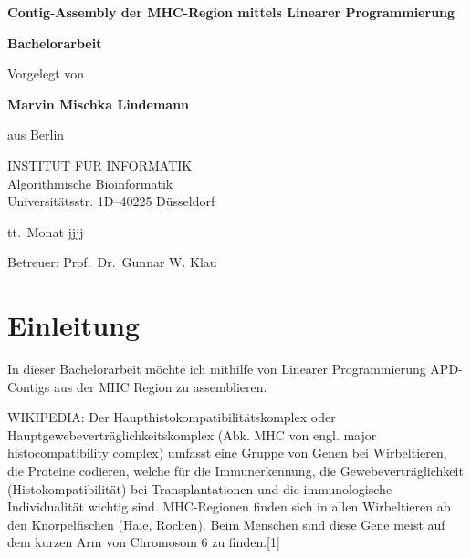 \documentclass[12pt,ngerman,titlepage,a4paper]{article}
\begin{document}
\begin{titlepage}
\begin{center}

\textbf{\LARGE Contig-Assembly der MHC-Region mittels Linearer Programmierung}

\bigskip\bigskip
\textbf{Bachelorarbeit}

\bigskip\bigskip\bigskip
Vorgelegt von

\bigskip
\textbf{Marvin Mischka Lindemann}

\bigskip
aus Berlin


\vfill
INSTITUT FÜR INFORMATIK\\
Algorithmische Bioinformatik\\
Universitätsstr. 1D–40225 Düsseldorf

\bigskip
tt.\ Monat jjjj

\bigskip
Betreuer: Prof.\ Dr.\ Gunnar W. Klau

\end{center}
\end{titlepage}

\thispagestyle{empty}\mbox{}\pagebreak
\setcounter{page}{0}

\tableofcontents
\pagebreak

\section{Einleitung}
In dieser Bachelorarbeit möchte ich mithilfe von Linearer Programmierung APD-Contigs aus der MHC Region zu assemblieren.

WIKIPEDIA:
Der Haupthistokompatibilitätskomplex oder Hauptgewebeverträglichkeitskomplex (Abk. MHC von engl. major histocompatibility complex) umfasst eine Gruppe von Genen bei Wirbeltieren, die Proteine codieren, welche für die Immunerkennung, die Gewebeverträglichkeit (Histokompatibilität) bei Transplantationen und die immunologische Individualität wichtig sind. MHC-Regionen finden sich in allen Wirbeltieren ab den Knorpelfischen (Haie, Rochen). Beim Menschen sind diese Gene meist auf dem kurzen Arm von Chromosom 6 zu finden.[1]
\end{document}

